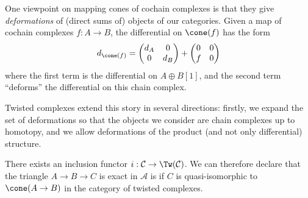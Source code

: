 

One viewpoint on mapping cones of cochain  complexes is that they give \emph{deformations} of (direct sums of) objects of our categories. Given a map of cochain complexes $f: A\to B$, the differential on $\cone(f)$ has the form 
\[d_{\cone(f)}=\begin{pmatrix} d_A & 0 \\ 0 & d_B \end{pmatrix} + \begin{pmatrix} 0 & 0\\ f & 0\end{pmatrix}\]
where the first term is the differential on $A\oplus B[1]$, and the second term ``deforms'' the differential on this chain complex.

Twisted complexes  extend this story in several directions: firstly, we expand the set of deformations so that the objects we consider are chain complexes up to homotopy, and we allow deformations of the product (and not only differential) structure.









There exists an inclusion functor $i:\mathcal C\to \Tw(\mathcal C)$.
We can therefore declare that the triangle $A\to B\to C$ is exact in  $\mathcal A$ is if $C$ is quasi-isomorphic to $\cone(A\to B)$ in the category of twisted complexes. 


